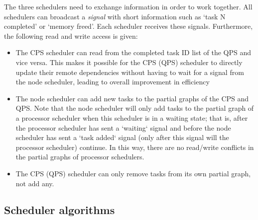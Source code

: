 The three schedulers need to exchange information in order to work together.
All schedulers can broadcast a \textit{signal} with short information such as `task N completed' or `memory freed'. Each scheduler receives these signals.
Furthermore, the following read and write access is given:
\begin{itemize}
    \item The CPS scheduler can read from the completed task ID list of the QPS and vice versa. This makes it possible for the CPS (QPS) scheduler to directly update their remote dependencies without having to wait for a signal from the node scheduler, leading to overall improvement in efficiency
    \item The node scheduler can add new tasks to the partial graphs of the CPS and QPS. Note that the node scheduler will only add tasks to the partial graph of a processor scheduler when this scheduler is in a waiting state; that is, after the processor scheduler has sent a `waiting` signal and before the node scheduler has sent a `task added` signal (only after this signal will the processor scheduler) continue. In this way, there are no read/write conflicts in the partial graphs of processor schedulers.
    \item The CPS (QPS) scheduler can only remove tasks from its own partial graph, not add any.
\end{itemize}



\subsection{Scheduler algorithms}

